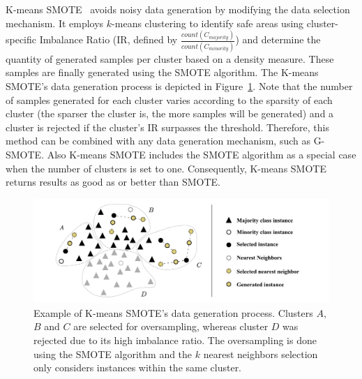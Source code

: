 \documentclass[information,article,submit,moreauthors,pdftex]{Definitions/mdpi}
\begin{document}
\begin{paracol}{2}
K-means SMOTE~\citep{Douzas2018} avoids noisy data
generation by modifying the data selection mechanism. It employs $k$-means
clustering to identify safe areas using cluster-specific Imbalance Ratio
(IR, defined by $\frac{count(C_{majority})}{count(C_{minority})}$) and
determine the quantity of generated samples per cluster based on a density
measure. These samples are finally generated using the SMOTE algorithm. The
K-means SMOTE's data generation process is depicted in
Figure~\ref{fig:kmeans_smote_example}. Note that the number of samples
generated for each cluster varies according to the sparsity of each cluster
(the sparser the cluster is, the more samples will be generated) and a cluster
is rejected if the cluster's IR surpasses the threshold.  Therefore, this
method can be combined with any data generation mechanism, such as G-SMOTE.
Also K-means SMOTE includes the SMOTE algorithm as a
special case when the number of clusters is set to one. Consequently,
K-means SMOTE returns
results as good as or better than SMOTE.

\end{paracol}
\begin{figure}[H]
	\centering
    \captionsetup{justification=centering}
    \caption{Example of K-means SMOTE's data generation
        process. Clusters $A$, $B$ and $C$ are selected for oversampling,
        whereas cluster $D$ was rejected due to its high imbalance ratio. The
        oversampling is done using the SMOTE algorithm and the $k$ nearest
        neighbors selection only considers instances
        within the same cluster.
    \vspace{.2cm}}
	\label{fig:kmeans_smote_example}
	\includegraphics[width=1\linewidth]{../analysis/kmeans_smote_example}
\end{figure}
\end{document}
